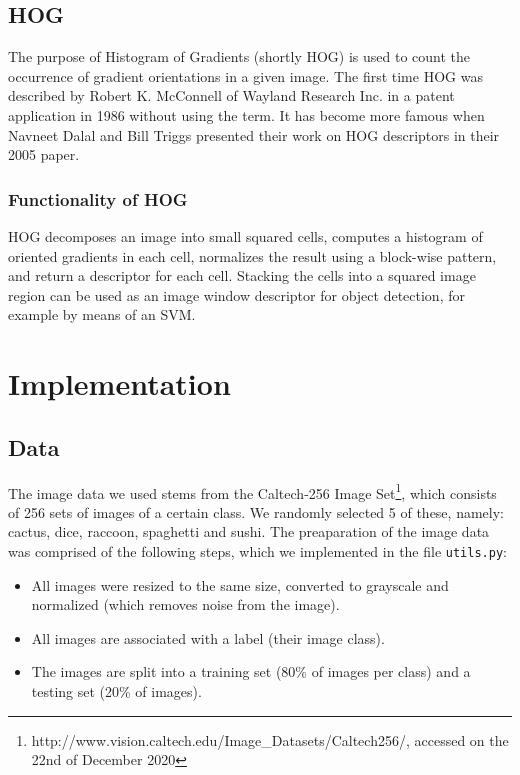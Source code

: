 \documentclass{scrartcl}
\begin{document}
\subsection{HOG}

The purpose of Histogram of Gradients (shortly HOG) is used to count the occurrence of gradient orientations in a given image. The first time HOG was described by Robert K. McConnell of Wayland Research Inc. in a patent application in 1986 without using the term. It has become more famous when Navneet Dalal and Bill Triggs \cite{Hog_article} presented their work on HOG descriptors in their 2005 paper.

\subsubsection{Functionality of HOG}

HOG decomposes an image into small squared cells, computes a histogram of oriented gradients in each cell, normalizes the result using a block-wise pattern, and return a descriptor for each cell. Stacking the cells into a squared image region can be used as an image window descriptor for object detection, for example by means of an SVM.

\section{Implementation}
\subsection{Data}
The image data we used stems from the Caltech-256 Image Set\footnote{http://www.vision.caltech.edu/Image\_Datasets/Caltech256/, accessed on the 22nd of December 2020}, which consists of 256 sets of images of a certain class. We randomly selected 5 of these, namely: cactus, dice, raccoon, spaghetti and sushi. The preaparation of the image data was comprised of the following steps, which we implemented in the file \texttt{utils.py}:
\begin{itemize}
  \item All images were resized to the same size, converted to grayscale and normalized (which removes noise from the image).
  \item All images are associated with a label (their image class).
  \item The images are split into a training set (80\% of images per class) and a testing set (20\% of images).
\end{itemize}
\end{document}
